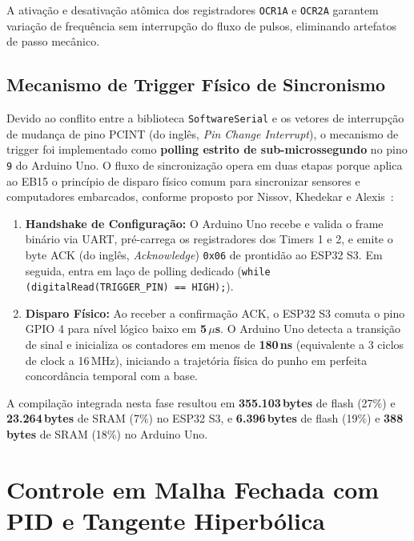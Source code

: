 A ativação e desativação atômica dos registradores \texttt{OCR1A} e \texttt{OCR2A} garantem variação de frequência sem interrupção do fluxo de pulsos, eliminando artefatos de passo mecânico.

\subsection{Mecanismo de Trigger Físico de Sincronismo}
\label{subsec:dev_trigger_fisico}

Devido ao conflito entre a biblioteca \texttt{SoftwareSerial} e os vetores de interrupção de mudança de pino PCINT (do inglês, \textit{Pin Change Interrupt}), o mecanismo de trigger foi implementado como \textbf{polling estrito de sub-microssegundo} no pino \texttt{9} do Arduino Uno. O fluxo de sincronização opera em duas etapas porque aplica ao EB15 o princípio de disparo físico comum para sincronizar sensores e computadores embarcados, conforme proposto por Nissov, Khedekar e Alexis~\cite{nissov2025simultaneous}:

\begin{enumerate}
    \item \textbf{Handshake de Configuração:} O Arduino Uno recebe e valida o frame binário via UART, pré-carrega os registradores dos Timers 1 e 2, e emite o byte ACK (do inglês, \textit{Acknowledge}) \texttt{0x06} de prontidão ao ESP32 S3. Em seguida, entra em laço de polling dedicado (\texttt{while (digitalRead(TRIGGER\_PIN) == HIGH);}).
    \item \textbf{Disparo Físico:} Ao receber a confirmação ACK, o ESP32 S3 comuta o pino GPIO 4 para nível lógico baixo em \textbf{5\,$\mu$s}. O Arduino Uno detecta a transição de sinal e inicializa os contadores em menos de \textbf{180\,ns} (equivalente a 3 ciclos de clock a 16\,MHz), iniciando a trajetória física do punho em perfeita concordância temporal com a base.
\end{enumerate}

A compilação integrada nesta fase resultou em \textbf{355.103\,bytes} de flash (27\%) e \textbf{23.264\,bytes} de SRAM (7\%) no ESP32 S3, e \textbf{6.396\,bytes} de flash (19\%) e \textbf{388\,bytes} de SRAM (18\%) no Arduino Uno.

\section{Controle em Malha Fechada com PID e Tangente Hiperbólica}
\label{sec:dev_malha_fechada}

